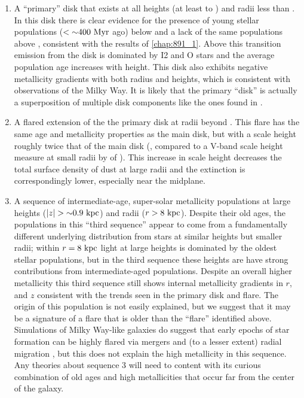 \begin{enumerate}
  
\item A ``primary'' disk that exists at all heights (at least to
  ) and radii less than . In this disk there
  is clear evidence for the presence of young stellar populations ($<
  {\sim} 400~\mathrm{Myr} $ ago) below  and a lack of the
  same populations above , consistent with the results
  of \ref{chap:891_1}. Above this transition emission from
  the disk is dominated by I2 and O stars and the average population
  age increases with height. This disk also exhibits negative
  metallicity gradients with both radius and heights, which is
  consistent with observations of the Milky Way. It is likely that the
  primary ``disk'' is actually a superposition of multiple disk
  components like the ones found in \citet{Schechtman-Rook13,
    Schechtman-Rook14}.

\item A flared extension of the the primary disk at radii beyond
  . This flare has the same age and metallicity properties
  as the main disk, but with a scale height roughly twice that of the
  main disk (, compared to a V-band scale height
  measure at small radii by \citet{Xilouris99} of
  ). This increase in scale height decreases the total
  surface density of dust at large radii and the extinction is
  correspondingly lower, especially near the midplane.
  
\item A sequence of intermediate-age, super-solar metallicity
  populations at large heights ($|z|> \val{\asim 0.9}{kpc}$) and radii
  ($r>8~\mathrm{kpc} $). Despite their old ages, the populations in this
  ``third sequence'' appear to come from a fundamentally different
  underlying distribution from stars at similar heights but smaller
  radii; within $r=8~\mathrm{kpc} $ light at large heights is dominated
  by the oldest stellar populations, but in the third sequence these
  heights are have strong contributions from intermediate-aged
  populations. Despite an overall higher metallicity this third
  sequence still shows internal metallicity gradients in $r$, and $z$
  consistent with the trends seen in the primary disk and flare. The
  origin of this population is not easily explained, but we suggest
  that it may be a signature of a flare that is older than the
  ``flare'' identified above. Simulations of Milky Way-like galaxies
  do suggest that early epochs of star formation can be highly flared
  via mergers and (to a lesser extent) radial migration
  \citep{Martig14b}, but this does not explain the high metallicity in
  this sequence. Any theories about sequence 3 will need to content
  with its curious combination of old ages and high metallicities that
  occur far from the center of the galaxy.

\end{enumerate}

